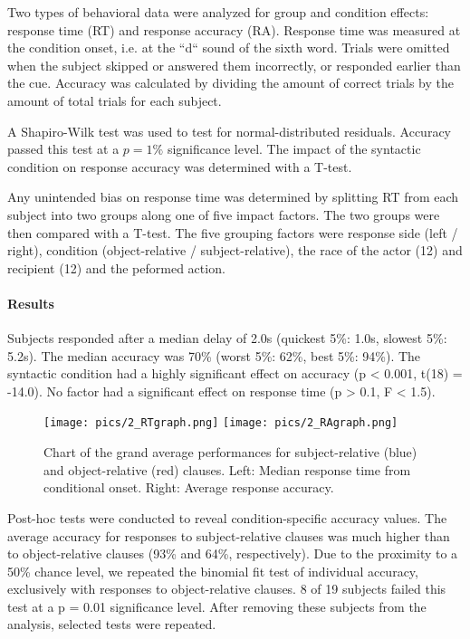 Two types of behavioral data were analyzed for group and condition effects: response time (RT) and response accuracy (RA).
Response time was measured at the condition onset, i.e. at the ``d`` sound of the sixth word.
Trials were omitted when the subject skipped or answered them incorrectly, or responded earlier than the cue.
Accuracy was calculated by dividing the amount of correct trials by the amount of total trials for each subject.

A Shapiro-Wilk test was used to test for normal-distributed residuals.
Accuracy passed this test at a $p = 1\%$ significance level.
The impact of the syntactic condition on response accuracy was determined with a T-test.

Any unintended bias on response time was determined by splitting RT from each subject into two groups along one of five impact factors.
The two groups were then compared with a T-test.
The five grouping factors were response side (left / right), condition (object-relative / subject-relative), the race of the actor (12) and recipient (12) and the peformed action.

\paragraph{Results}

Subjects responded after a median delay of 2.0s (quickest 5\%: 1.0s, slowest 5\%: 5.2s).
The median accuracy was 70\% (worst 5\%: 62\%, best 5\%: 94\%).
The syntactic condition had a highly significant effect on accuracy (p < 0.001, t(18) = -14.0).
No factor had a significant effect on response time (p > 0.1, F < 1.5).

\begin{figure}[h]
\begin{center}
\texttt{[image: pics/2\_RTgraph.png]}
\texttt{[image: pics/2\_RAgraph.png]}
\caption{\label{2.RTgraph} Chart of the grand average performances for subject-relative (blue) and object-relative (red) clauses. Left: Median response time from conditional onset. Right: Average response accuracy.}
\end{center}
\end{figure}

Post-hoc tests were conducted to reveal condition-specific accuracy values.
The average accuracy for responses to subject-relative clauses was much higher than to object-relative clauses (93\% and 64\%, respectively).
Due to the proximity to a 50\% chance level, we repeated the binomial fit test of individual accuracy, exclusively with responses to object-relative clauses.
8 of 19 subjects failed this test at a p = 0.01 significance level.
After removing these subjects from the analysis, selected tests were repeated.

